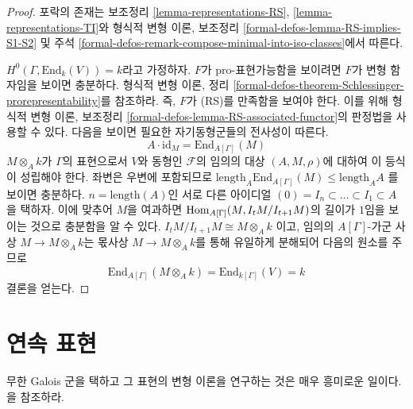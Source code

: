 \begin{proof}
포락의 존재는 보조정리 \ref{lemma-representations-RS},
\ref{lemma-representations-TI}와 형식적 변형 이론, 보조정리
\ref{formal-defos-lemma-RS-implies-S1-S2} 및 주석
\ref{formal-defos-remark-compose-minimal-into-iso-classes}에서 따른다.

\medskip\noindent
$H^0(\Gamma, \text{End}_k(V)) = k$라고 가정하자. $F$가
pro-표현가능함을 보이려면 $F$가 변형 함자임을 보이면 충분하다.
형식적 변형 이론, 정리
\ref{formal-defos-theorem-Schlessinger-prorepresentability}를 참조하라.
즉, $F$가 (RS)를 만족함을 보여야 한다. 이를 위해 형식적 변형 이론,
보조정리 \ref{formal-defos-lemma-RS-associated-functor}의 판정법을
사용할 수 있다. 다음을 보이면 필요한 자기동형군들의 전사성이 따른다.
$$
A \cdot \text{id}_M =
\text{End}_{A[\Gamma]}(M)
$$
$M \otimes_A k$가 $\Gamma$의 표현으로서 $V$와 동형인
$\mathcal{F}$의 임의의 대상 $(A, M, \rho)$에 대하여 이 등식이
성립해야 한다. 좌변은 우변에 포함되므로
$\text{length}_A \text{End}_{A[\Gamma]}(M) \leq \text{length}_A A$
를 보이면 충분하다. $n = \text{length}(A)$인 서로 다른 아이디얼
$(0) = I_n \subset \ldots \subset I_1 \subset A$
을 택하자. 이에 맞추어 $M$을 여과하면
$\mathop{\mathrm{Hom}}\nolimits_{A[\Gamma]}(M, I_tM/I_{t + 1}M)$의 길이가 $1$임을
보이는 것으로 충분함을 알 수 있다. $I_tM/I_{t + 1}M \cong M \otimes_A k$
이고, 임의의 $A[\Gamma]$-가군 사상 $M \to M \otimes_A k$는
몫사상 $M \to M \otimes_A k$를 통해 유일하게 분해되어 다음의 원소를
주므로
$$
\text{End}_{A[\Gamma]}(M \otimes_A k) = \text{End}_{k[\Gamma]}(V) = k
$$
결론을 얻는다.
\end{proof}



\section{연속 표현}
\label{section-continuous-representations}

\noindent
무한 Galois 군을 택하고 그 표현의 변형 이론을 연구하는 것은
매우 흥미로운 일이다. \cite{Mazur-deforming}을 참조하라.

